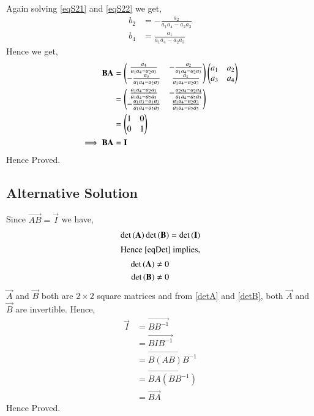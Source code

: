 \documentclass[journal,12pt,twocolumn]{IEEEtran}
\begin{document}
Again solving \eqref{eqS21} and \eqref{eqS22} we get,
\begin{align}
b_2 &= -\frac{a_2}{a_1a_4-a_2a_3}\label{sol3}\\
b_4 &= \frac{a_1}{a_1a_4-a_2a_3}\label{sol4}
\end{align}
Hence we get,
\begin{align}
\vec{BA} &= \myvec{\frac{a_4}{a_1a_4-a_2a_3}&-\frac{a_2}{a_1a_4-a_2a_3}\\-\frac{a_3}{a_1a_4-a_2a_3}&\frac{a_1}{a_1a_4-a_2a_3}}\myvec{a_1&a_2\\a_3&a_4}\\
&= \myvec{\frac{a_1a_4-a_2a_3}{a_1a_4-a_2a_3}&-\frac{a_2a_4-a_2a_4}{a_1a_4-a_2a_3}\\-\frac{a_1a_3-a_1a_3}{a_1a_4-a_2a_3}&\frac{a_1a_4-a_2a_3}{a_1a_4-a_2a_3}}\\
&= \myvec{1&0\\0&1}\\
\implies\vec{BA}&=\vec{I}
\end{align}
Hence Proved.
\subsection{Alternative Solution}
Since $\vec{AB} = \vec{I}$ we have,
\begin{align}
\det{(\vec{A})}\det{(\vec{B})} &= \det{(\vec{I})}\label{eqDet}\\
\intertext{Hence \eqref{eqDet} implies,}
\det{(\vec{A})} \not= 0\label{detA}\\
\det{(\vec{B})} \not= 0\label{detB}
\end{align}
$\vec{A}$ and $\vec{B}$ both are $2 \times 2$  square matrices and from \eqref{detA} and \eqref{detB}, both $\vec{A}$ and $\vec{B}$ are invertible. Hence,
\begin{align}
\vec{I}&=\vec{BB^{-1}}\\
&=\vec{BIB^{-1}}\\
&=\vec{B(AB)B^{-1}}\\
&=\vec{BA(BB^{-1})}\\
&=\vec{BA}
\end{align}
Hence Proved.
\end{document}
